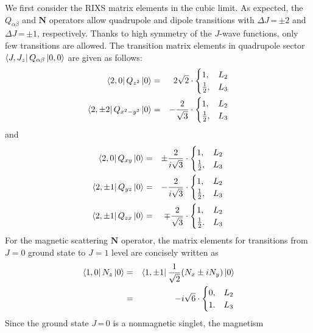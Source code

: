 \documentclass[twocolumn,prb,aps,showpacs,superscriptaddress]{revtex4-1}
\begin{document}
We first consider the RIXS matrix elements in the cubic limit. As expected, the
$Q_{\alpha\beta}$ and $\mathbf{N}$ operators allow quadrupole and dipole
transitions with $\Delta J$\,=\,$\pm 2$ and $\Delta J$\,=\,$\pm 1$,
respectively. Thanks to high symmetry of the $J$-wave functions, only few
transitions are allowed. The transition matrix elements in quadrupole sector 
$\bra{J,J_z}Q_{\alpha\beta}\ket{0,0}$ are given as follows:
\begin{eqnarray}
\bra{2,0}Q_{z^2}\ket{0}&=&2\sqrt{2}\cdot
\begin{cases} 
	1, & L_2 \\
	\frac{1}{2}, & L_3
\end{cases}\\
\bra{2,\pm 2}Q_{x^2-y^2}\ket{0}&=&-\frac{2}{\sqrt{3}}\cdot
\begin{cases} 
	1, & L_2 \\
	\frac{1}{2}, & L_3
\end{cases}
\end{eqnarray}
and 
\begin{eqnarray}
\bra{2,0}Q_{xy}\ket{0}&=&\pm \frac{2}{i\sqrt{3}}\cdot
\begin{cases} 
	1, & L_2 \\
	\frac{1}{2}, & L_3
\end{cases}\\
\bra{2,\pm 1}Q_{yz}\ket{0}&=&-\frac{2}{i\sqrt{3}}\cdot
\begin{cases} 
	1, & L_2 \\
	\frac{1}{2}, & L_3
\end{cases}\\
\bra{2,\pm 1}Q_{zx}\ket{0}&=&\mp \frac{2}{\sqrt{3}}\cdot
\begin{cases} 
	1, & L_2 \\
	\frac{1}{2}. & L_3
\end{cases}
\end{eqnarray}
For the magnetic scattering ${\mathbf N}$ operator, the matrix elements for 
transitions from $J=0$ ground state to $J=1$ level are concisely written as 
\begin{eqnarray}
\bra{1,0}N_z\ket{0}&=&\bra{1,\pm 1}\frac{1}{\sqrt{2}}(N_x \pm iN_y)\ket{0}
\nonumber\\ 
&=&-i{\sqrt{6}}\cdot
\begin{cases} 
	0, & L_2 \\
	1. & L_3
\end{cases}
\end{eqnarray}
Since the ground state $J$\,=\,0 is a nonmagnetic singlet, the magnetism 
\end{document}

